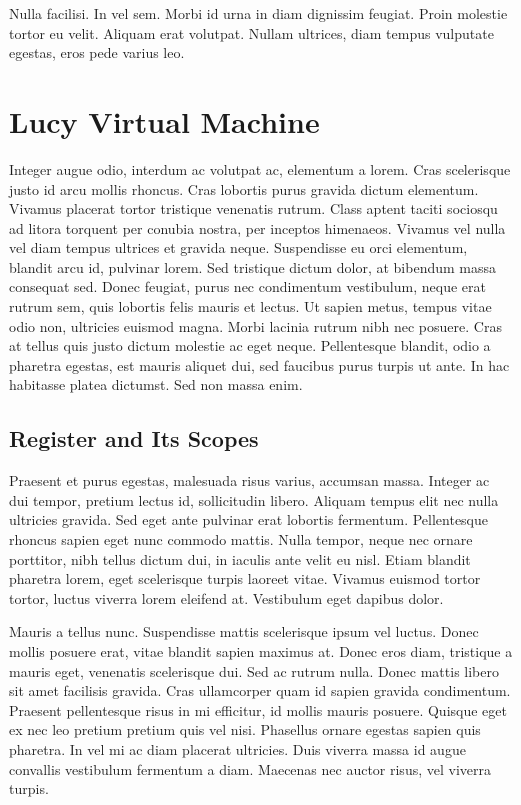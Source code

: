 \begin{savequote}[75mm]
Nulla facilisi. In vel sem. Morbi id urna in diam dignissim feugiat. Proin molestie tortor eu velit. Aliquam erat volutpat. Nullam ultrices, diam tempus vulputate egestas, eros pede varius leo.
\end{savequote}

\chapter{Lucy Virtual Machine}
Integer augue odio, interdum ac volutpat ac, elementum a lorem. Cras scelerisque justo id arcu mollis rhoncus. Cras lobortis purus gravida dictum elementum. Vivamus placerat tortor tristique venenatis rutrum. Class aptent taciti sociosqu ad litora torquent per conubia nostra, per inceptos himenaeos. Vivamus vel nulla vel diam tempus ultrices et gravida neque. Suspendisse eu orci elementum, blandit arcu id, pulvinar lorem. Sed tristique dictum dolor, at bibendum massa consequat sed. Donec feugiat, purus nec condimentum vestibulum, neque erat rutrum sem, quis lobortis felis mauris et lectus. Ut sapien metus, tempus vitae odio non, ultricies euismod magna. Morbi lacinia rutrum nibh nec posuere. Cras at tellus quis justo dictum molestie ac eget neque. Pellentesque blandit, odio a pharetra egestas, est mauris aliquet dui, sed faucibus purus turpis ut ante. In hac habitasse platea dictumst. Sed non massa enim.


\section{Register and Its Scopes}
Praesent et purus egestas, malesuada risus varius, accumsan massa. Integer ac dui tempor, pretium lectus id, sollicitudin libero. Aliquam tempus elit nec nulla ultricies gravida. Sed eget ante pulvinar erat lobortis fermentum. Pellentesque rhoncus sapien eget nunc commodo mattis. Nulla tempor, neque nec ornare porttitor, nibh tellus dictum dui, in iaculis ante velit eu nisl. Etiam blandit pharetra lorem, eget scelerisque turpis laoreet vitae. Vivamus euismod tortor tortor, luctus viverra lorem eleifend at. Vestibulum eget dapibus dolor.

Mauris a tellus nunc. Suspendisse mattis scelerisque ipsum vel luctus. Donec mollis posuere erat, vitae blandit sapien maximus at. Donec eros diam, tristique a mauris eget, venenatis scelerisque dui. Sed ac rutrum nulla. Donec mattis libero sit amet facilisis gravida. Cras ullamcorper quam id sapien gravida condimentum. Praesent pellentesque risus in mi efficitur, id mollis mauris posuere. Quisque eget ex nec leo pretium pretium quis vel nisi. Phasellus ornare egestas sapien quis pharetra. In vel mi ac diam placerat ultricies. Duis viverra massa id augue convallis vestibulum fermentum a diam. Maecenas nec auctor risus, vel viverra turpis.

